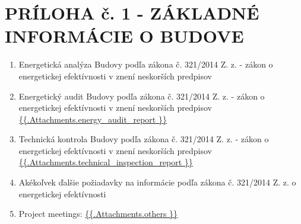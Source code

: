 \section{PRÍLOHA č. 1 {-} ZÁKLADNÉ INFORMÁCIE O BUDOVE}

\begin{enumerate}[label=\arabic*.]
	\item Energetická analýza Budovy podľa zákona č. 321/2014 Z. z. - zákon o energetickej efektívnosti v znení neskorších predpisov

    \item Energetický audit Budovy podľa zákona č. 321/2014 Z. z. - zákon o energetickej efektívnosti v znení neskorších predpisov 
\url{ {{.Attachments.energy_audit_report }} }

\iffalse attachment value="energy audit report" \fi

	\item Technická kontrola Budovy podľa zákona č. 321/2014 Z. z. - zákon o energetickej efektívnosti v znení neskorších predpisov
\url{ {{.Attachments.technical_inspection_report }} }

    \item Akékoľvek ďalšie požiadavky na informácie podľa zákona č. 321/2014 Z. z. o energetickej efektívnosti 

\iffalse attachment value="technical inspection report" \fi
	\item Project meetings:
          \url{ {{.Attachments.others }} }
          \iffalse attachment value="others" \fi

\end{enumerate}
